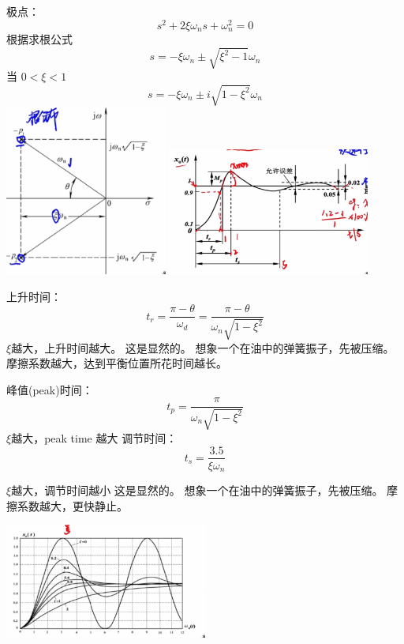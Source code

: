 极点：
\begin{equation*}
	 s^2 + 2 \xi \omega_n s + \omega_n^2 = 0
\end{equation*}
根据求根公式
\begin{equation*}
	s = -\xi \omega_n \pm \sqrt{\xi^2 -1} \omega_n
\end{equation*}
当 \(0< \xi < 1\)
\begin{equation*}
	s = -\xi \omega_n \pm i \sqrt{1 - \xi^2 } \omega_n
\end{equation*}
\includegraphics[width=0.4\textwidth]{figures/2021-09-23T004059+0800.png}
\includegraphics[width=0.5\textwidth]{figures/2021-09-23T004313+0800.png}

上升时间：
\begin{equation*}
	t_r = \frac{\pi - \theta}{ \omega_d } = \frac{\pi - \theta}{ \omega_n \sqrt{1 - \xi^2} }
\end{equation*}
\(\xi\)越大，上升时间越大。
这是显然的。
想象一个在油中的弹簧振子，先被压缩。
摩擦系数越大，达到平衡位置所花时间越长。

峰值(peak)时间：
\begin{equation}
	t_p = \frac{\pi}{ \omega_n \sqrt{1-\xi^2} }
\end{equation}
\(\xi\)越大，peak time 越大
调节时间：
\begin{equation*}
	t_s = \frac{3.5}{\xi \omega_n}
\end{equation*}

\(\xi\)越大，调节时间越小
这是显然的。
想象一个在油中的弹簧振子，先被压缩。
摩擦系数越大，更快静止。

\includegraphics[width=0.5\textwidth]{figures/2021-09-23T011056+0800.png}





